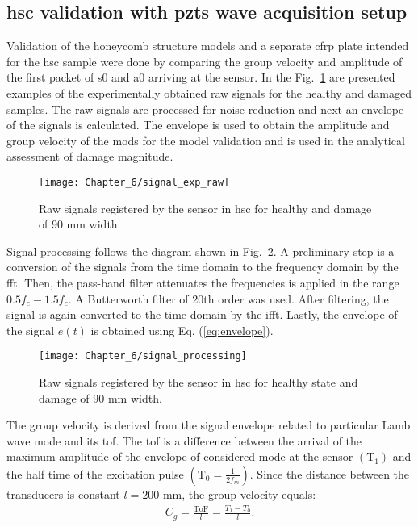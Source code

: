 \subsection{\acs{hsc} validation with \acsp{pzt} wave acquisition setup}
Validation of the honeycomb structure models and a separate \ac{cfrp} plate intended for the \ac{hsc} sample were done by comparing the group velocity and amplitude of the first packet of \ac{s0} and \ac{a0} arriving at the sensor.
In the Fig.~\ref{fig:signal_exp_raw} are presented examples of the experimentally obtained raw signals for the healthy and damaged samples.
The raw signals are processed for noise reduction and next an envelope of the signals is calculated.
The envelope is used to obtain the amplitude and group velocity of the mods for the model validation and is used in the analytical assessment of damage magnitude.
\begin{figure}[H]
	\begin{center}
		\texttt{[image: Chapter\_6/signal\_exp\_raw]}
	\end{center}
	\caption{Raw signals registered by the sensor in \acf{hsc} for healthy and damage of 90 \unit{\mm} width.}
	\label{fig:signal_exp_raw}
\end{figure}

Signal processing follows the diagram shown in Fig.~\ref{fig:signal_processing}.
A preliminary step is a conversion of the signals from the time domain to the frequency domain by the \ac{fft}.
Then, the pass-band filter attenuates the frequencies is applied in the range \(0.5f_c-1.5f_c\).
A Butterworth filter of 20th order was used.
After filtering, the signal is again converted to the time domain by the \ac{ifft}.
Lastly, the envelope of the signal \(e(t)\) is obtained using Eq. (\ref{eq:envelope}).

\begin{figure}[H]
	\begin{center}
		\texttt{[image: Chapter\_6/signal\_processing]}
	\end{center}
	\caption{Raw signals registered by the sensor in \acf{hsc} for healthy state and damage of 90 \unit{\mm} width.}
	\label{fig:signal_processing}
\end{figure}

The group velocity is derived from the signal envelope related to particular Lamb wave mode and its \ac{tof}.
The \ac{tof} is a difference between the arrival of the maximum amplitude of the envelope of considered mode at the sensor \((\mathrm{T}_1)\) and the half time of the excitation pulse \(\left(\mathrm{T}_0=\frac{1}{2f_m}\right)\).
Since the distance between the transducers is constant \(l=200\) \unit{\mm}, the group velocity equals:
\begin{eqnarray}
	C_g = \frac{\mathrm{ToF}}{l}=\frac{T_1-T_0}{l}.
\end{eqnarray}

